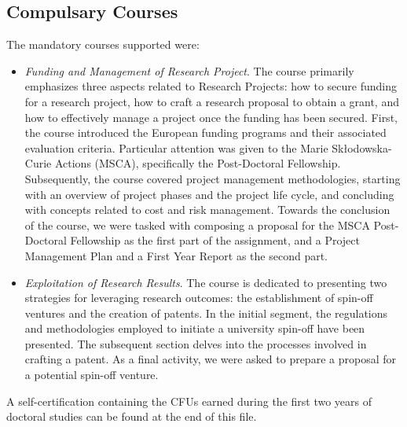 \subsection{Compulsary Courses}
The mandatory courses supported were:
\begin{itemize}
    \item \textit{Funding and Management of Research Project}. The course primarily emphasizes three aspects related to Research Projects: how to secure funding for a research project, how to craft a research proposal to obtain a grant, and how to effectively manage a project once the funding has been secured. First, the course introduced the European funding programs and their associated evaluation criteria. Particular attention was given to the Marie Skłodowska-Curie Actions (MSCA), specifically the Post-Doctoral Fellowship. Subsequently, the course covered project management methodologies, starting with an overview of project phases and the project life cycle, and concluding with concepts related to cost and risk management. Towards the conclusion of the course, we were tasked with composing a proposal for the MSCA Post-Doctoral Fellowship as the first part of the assignment, and a Project Management Plan and a First Year Report as the second part.
    \item \textit{Exploitation of Research Results}. The course is dedicated to presenting two strategies for leveraging research outcomes: the establishment of spin-off ventures and the creation of patents. In the initial segment, the regulations and methodologies employed to initiate a university spin-off have been presented. The subsequent section delves into the processes involved in crafting a patent. As a final activity, we were asked to prepare a proposal for a potential spin-off venture.
\end{itemize}
A self-certification containing the CFUs earned during the first two years of doctoral studies can be found at the end of this file.